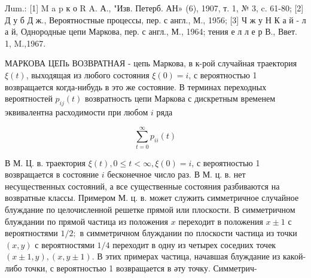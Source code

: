 \documentclass[10pt]{article}
\begin{document}
Лum.: [1] M a p к о R A. А., "Изв. Петерб. АН» (6), 1907, т. 1, № 3, c. 61-80; [2] Д у б Д ж., Вероятностные процессы, пер. с англ., М., 1956; [3] Ч ж у Н К а й - л а й, Однородные цепи Маркова, пер. с англ., М., 1964; тения е л л е р В., Ввет. 1, M.,1967.



МАРКОВА ЦЕПь ВОЗВРАТНАЯ - цепь Маркова, в к-рой случайная траектория $\xi(t)$, выходящая из любого состояния $\xi(0)=i$, с вероятностью 1 возвращается когда-нибудь в это же состояние. В терминах переходных вероятностей $p_{i j}(t)$ возвратность цепи Маркова с дискретным временем эквивалентна расходимости при любом $i$ ряда



\[

\sum_{t=0}^{\infty} p_{i i}(t)

\]



В М. Ц. в. траектория $\xi(t), 0 \leqslant t<\infty, \xi(0)=i$, с вероятностью 1 возвращается в состояние $i$ бесконечное число раз. В М. ц. в. нет несущественных состояний, а все существенные состояния разбиваются на возвратные классы. Примером М. ц. в. может служить симметричное случайное блуждание по целочисленной решетке прямой или плоскости. В симметричном блуждании по прямой частица из положения $x$ переходит в положения $x \pm 1$ с вероятностями $1 / 2 ;$ в симметричном блуждании по плоскости частица из точки $(x, y)$ с вероятностями $1 / 4$ переходит в одну из четырех соседних точек $(x \pm 1, y),(x, y \pm 1)$. В этих примерах частица, начавшая блуждание из какой-либо точки, с вероятностью 1 возвращается в әту точку. Симметрич-
\end{document}
